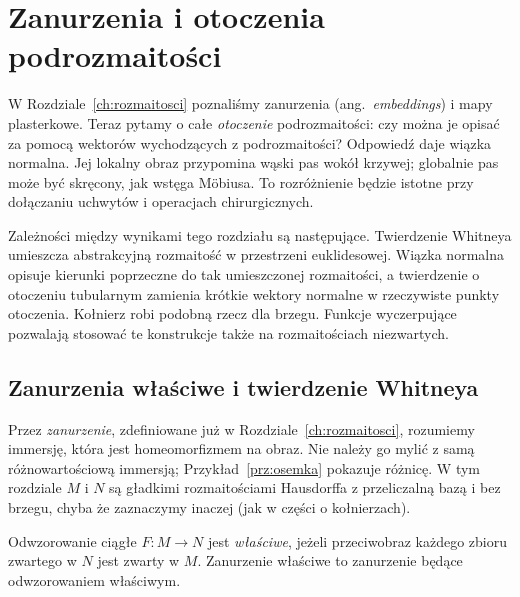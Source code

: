 \chapter{Zanurzenia i otoczenia podrozmaitości}
\label{ch:wlozenia-otoczenia}

W Rozdziale~\ref{ch:rozmaitosci} poznaliśmy zanurzenia
(ang.\ \emph{embeddings}) i mapy plasterkowe.
Teraz pytamy o całe \emph{otoczenie} podrozmaitości:
czy można je opisać za pomocą wektorów wychodzących
z podrozmaitości? Odpowiedź daje wiązka normalna.
Jej lokalny obraz przypomina wąski pas wokół krzywej;
globalnie pas może być skręcony, jak wstęga Möbiusa.
To rozróżnienie będzie istotne przy dołączaniu uchwytów
i operacjach chirurgicznych.

Zależności między wynikami tego rozdziału są następujące.
Twierdzenie Whitneya umieszcza abstrakcyjną rozmaitość
w przestrzeni euklidesowej. Wiązka normalna opisuje
kierunki poprzeczne do tak umieszczonej rozmaitości,
a twierdzenie o otoczeniu tubularnym zamienia krótkie
wektory normalne w rzeczywiste punkty otoczenia.
Kołnierz robi podobną rzecz dla brzegu. Funkcje
wyczerpujące pozwalają stosować te konstrukcje także
na rozmaitościach niezwartych.

\section{Zanurzenia właściwe i twierdzenie Whitneya}
\label{sec:whitney-wlozenia}

Przez \emph{zanurzenie}, zdefiniowane już
w Rozdziale~\ref{ch:rozmaitosci}, rozumiemy immersję,
która jest homeomorfizmem na obraz. Nie należy go
mylić z samą różnowartościową immersją;
Przykład~\ref{prz:osemka} pokazuje różnicę.
W tym rozdziale $M$ i $N$ są gładkimi rozmaitościami
Hausdorffa z przeliczalną bazą i bez brzegu, chyba że
zaznaczymy inaczej (jak w części o kołnierzach).

\begin{definicja}
\label{def:odwzorowanie-wlasciwe}
Odwzorowanie ciągłe $F:M\to N$ jest \emph{właściwe},
jeżeli przeciwobraz każdego zbioru zwartego w $N$
jest zwarty w $M$. Zanurzenie właściwe to zanurzenie
będące odwzorowaniem właściwym.
\end{definicja}


